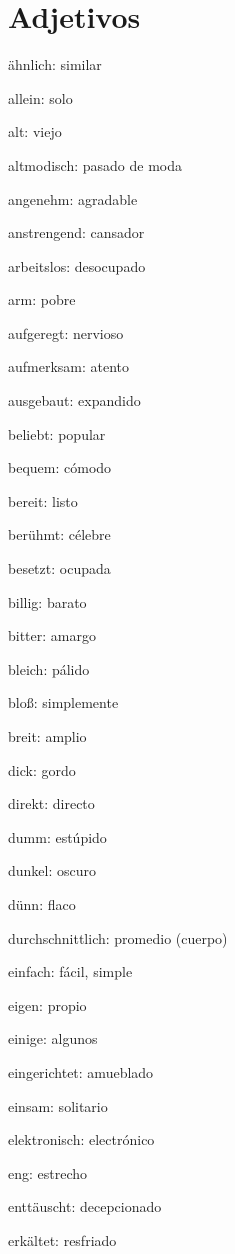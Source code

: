 \section{Adjetivos}
\begin{multicols}{2}
\begin{myitemize}
\item ähnlich: similar
\item allein: solo
\item alt: viejo
\item altmodisch: pasado de moda
\item angenehm: agradable
\item anstrengend: cansador
\item arbeitslos: desocupado
\item arm: pobre
\item aufgeregt: nervioso
\item aufmerksam: atento
\item ausgebaut: expandido
\item beliebt: popular
\item bequem: cómodo
\item bereit: listo
\item berühmt: célebre
\item besetzt: ocupada
\item billig: barato
\item bitter: amargo
\item bleich: pálido
\item bloß: simplemente
\item breit: amplio
\item dick: gordo
\item direkt: directo
\item dumm: estúpido
\item dunkel: oscuro
\item dünn: flaco
\item durchschnittlich: promedio (cuerpo)
\item einfach: fácil, simple
\item eigen: propio
\item einige: algunos
\item eingerichtet: amueblado
\item einsam: solitario
\item elektronisch: electrónico
\item eng: estrecho
\item enttäuscht: decepcionado
\item erkältet: resfriado

\end{myitemize}
\end{multicols}
